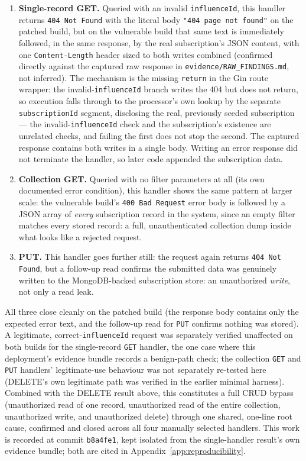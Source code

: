 \documentclass[12pt,a4paper]{report}
\begin{document}
\begin{enumerate}
\item \textbf{Single-record GET.} Queried with an invalid \texttt{influenceId}, this handler returns \texttt{404 Not Found} with the literal body \texttt{"404 page not found"} on the patched build, but on the vulnerable build that same text is immediately followed, in the same response, by the real subscription's JSON content, with one \texttt{Content-Length} header sized to both writes combined (confirmed directly against the captured raw response in \texttt{evidence/RAW\_FINDINGS.md}, not inferred). The mechanism is the missing \texttt{return} in the Gin route wrapper: the invalid-\texttt{influenceId} branch writes the 404 but does not return, so execution falls through to the processor's own lookup by the separate \texttt{subscriptionId} segment, disclosing the real, previously seeded subscription — the invalid-\texttt{influenceId} check and the subscription's existence are unrelated checks, and failing the first does not stop the second. The captured response contains both writes in a single body. Writing an error response did not terminate the handler, so later code appended the subscription data.

\item \textbf{Collection GET.} Queried with no filter parameters at all (its own documented error condition), this handler shows the same pattern at larger scale: the vulnerable build's \texttt{400 Bad Request} error body is followed by a JSON array of \emph{every} subscription record in the system, since an empty filter matches every stored record: a full, unauthenticated collection dump inside what looks like a rejected request.

\item \textbf{PUT.} This handler goes further still: the request again returns \texttt{404 Not Found}, but a follow-up read confirms the submitted data was genuinely written to the MongoDB-backed subscription store: an unauthorized \emph{write}, not only a read leak.
\end{enumerate}

All three close cleanly on the patched build (the response body contains only the expected error text, and the follow-up read for \texttt{PUT} confirms nothing was stored). A legitimate, correct-\texttt{influenceId} request was separately verified unaffected on both builds for the single-record \texttt{GET} handler, the one case where this deployment's evidence bundle records a benign-path check; the collection \texttt{GET} and \texttt{PUT} handlers' legitimate-use behaviour was not separately re-tested here (DELETE's own legitimate path was verified in the earlier minimal harness). Combined with the DELETE result above, this constitutes a full CRUD bypass (unauthorized read of one record, unauthorized read of the entire collection, unauthorized write, and unauthorized delete) through one shared, one-line root cause, confirmed and closed across all four manually selected handlers. This work is recorded at commit \texttt{b8a4fe1}, kept isolated from the single-handler result's own evidence bundle; both are cited in Appendix~\ref{app:reproducibility}.
\end{document}
